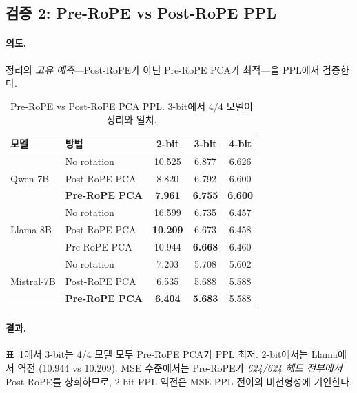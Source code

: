 \subsection{검증 2: Pre-RoPE vs Post-RoPE PPL}
\label{sec:exp_prerope}

\paragraph{의도.} 정리의 \emph{고유 예측}---Post-RoPE가 아닌 Pre-RoPE PCA가 최적---을 PPL에서 검증한다.

\begin{table}[t]
\centering
\caption{Pre-RoPE vs Post-RoPE PCA PPL. 3-bit에서 4/4 모델이 정리와 일치.}
\label{tab:prerope}
\small
\begin{tabular}{@{}llccc@{}}
\toprule
모델 & 방법 & 2-bit & 3-bit & 4-bit \\
\midrule
\multirow{3}{*}{Qwen-7B} & No rotation & 10.525 & 6.877 & 6.626 \\
 & Post-RoPE PCA & 8.820 & 6.792 & 6.600 \\
 & \textbf{Pre-RoPE PCA} & \textbf{7.961} & \textbf{6.755} & \textbf{6.600} \\
\midrule
\multirow{3}{*}{Llama-8B} & No rotation & 16.599 & 6.735 & 6.457 \\
 & Post-RoPE PCA & \textbf{10.209} & 6.673 & 6.458 \\
 & Pre-RoPE PCA & 10.944 & \textbf{6.668} & 6.460 \\
\midrule
\multirow{3}{*}{Mistral-7B} & No rotation & 7.203 & 5.708 & 5.602 \\
 & Post-RoPE PCA & 6.535 & 5.688 & 5.588 \\
 & \textbf{Pre-RoPE PCA} & \textbf{6.404} & \textbf{5.683} & 5.588 \\
\bottomrule
\end{tabular}
\end{table}

\paragraph{결과.} 표~\ref{tab:prerope}에서 3-bit는 4/4 모델 모두 Pre-RoPE PCA가 PPL 최저. 2-bit에서는 Llama에서 역전 (10.944 vs 10.209). MSE 수준에서는 Pre-RoPE가 \emph{624/624 헤드 전부에서} Post-RoPE를 상회하므로, 2-bit PPL 역전은 MSE-PPL 전이의 비선형성에 기인한다.


